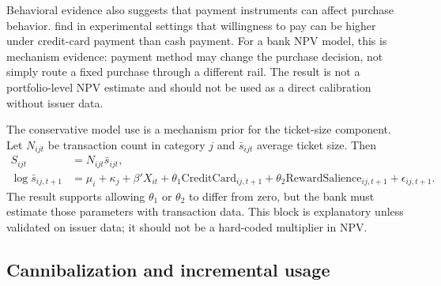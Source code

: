 \documentclass[11pt]{article}
\newcommand{\1}{\mathbf{1}}
\begin{document}
Behavioral evidence also suggests that payment instruments can affect purchase
behavior. \citet{prelec2001creditcard} find in experimental settings that
willingness to pay can be higher under credit-card payment than cash payment.
For a bank NPV model, this is mechanism evidence: payment method may change the
purchase decision, not simply route a fixed purchase through a different rail.
The result is not a portfolio-level NPV estimate and should not be used as a
direct calibration without issuer data.

The conservative model use is a mechanism prior for the ticket-size component.
Let $N_{ijt}$ be transaction count in category $j$ and $\bar{s}_{ijt}$ average
ticket size. Then
\begin{align}
  S_{ijt} &= N_{ijt}\bar{s}_{ijt}, \label{eq:spend-count-ticket}\\
  \log \bar{s}_{ij,t+1}
    &= \mu_i+\kappa_j+\beta'X_{it}
       +\theta_1 \mathrm{CreditCard}_{ij,t+1}
       +\theta_2 \mathrm{RewardSalience}_{ij,t+1}
       +\epsilon_{ij,t+1}.
       \label{eq:ticket-size-payment}
\end{align}
The \citet{prelec2001creditcard} result supports allowing
$\theta_1$ or $\theta_2$ to differ from zero, but the bank must estimate those
parameters with transaction data. This block is explanatory unless validated on
issuer data; it should not be a hard-coded multiplier in NPV.

\subsection{Cannibalization and incremental usage}
\end{document}
